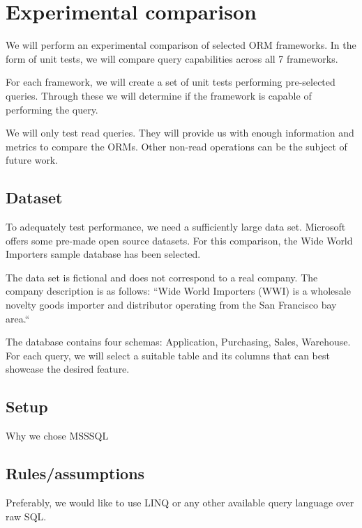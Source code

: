 \chapter{Experimental comparison}

We will perform an experimental comparison of selected ORM frameworks. In the form of unit tests, we will compare query capabilities across all 7 frameworks.

For each framework, we will create a set of unit tests performing pre-selected queries. Through these we will determine if the framework is capable of performing the query. 



We will only test read queries. They will provide us with enough information and metrics to compare the ORMs. Other non-read operations can be the subject of future work.

\section{Dataset}
To adequately test performance, we need a sufficiently large data set. Microsoft offers some pre-made open source datasets.
For this comparison, the Wide World Importers sample database\cite{microsoftWWI} has been selected.

The data set is fictional and does not correspond to a real company. The company description is as follows: ``Wide World Importers (WWI) is a wholesale novelty goods importer and distributor operating from the San Francisco bay area.``\cite{microsoftWWI}

The database contains four schemas: Application, Purchasing, Sales, Warehouse. For each query, we will select a suitable table and its columns that can best showcase the desired feature.

\section{Setup}
Why we chose MSSSQL

\section{Rules/assumptions} %
Preferably, we would like to use LINQ or any other available query language over raw SQL. 



